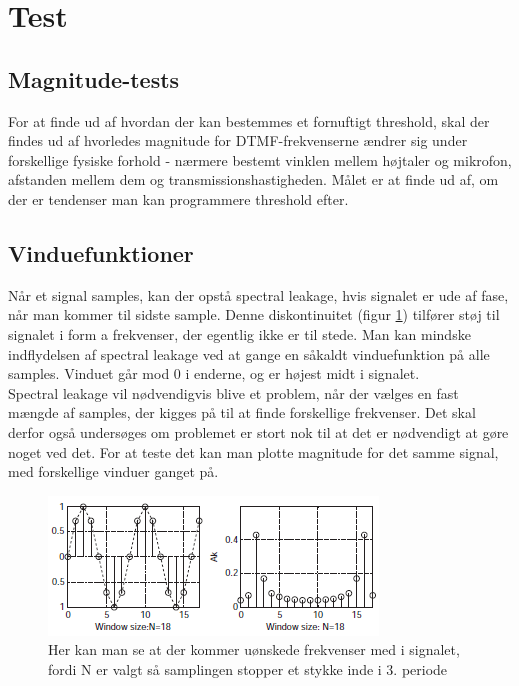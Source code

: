 \section{Test}

\subsection{Magnitude-tests}

For at finde ud af hvordan der kan bestemmes et fornuftigt threshold, skal der findes ud af hvorledes magnitude for DTMF-frekvenserne ændrer sig under forskellige fysiske forhold - nærmere bestemt vinklen mellem højtaler og mikrofon, afstanden mellem dem og transmissionshastigheden. Målet er at finde ud af, om der er tendenser man kan programmere threshold efter. 

\subsection{Vinduefunktioner}

Når et signal samples, kan der opstå spectral leakage, hvis signalet er ude af fase, når man kommer til sidste sample. Denne diskontinuitet (figur \ref{fig:Spectral}) tilfører støj til signalet i form a frekvenser, der egentlig ikke er til stede. Man kan mindske indflydelsen af spectral leakage ved at gange en såkaldt vinduefunktion på alle samples. Vinduet går mod 0 i enderne, og er højest midt i signalet.\\
Spectral leakage vil nødvendigvis blive et problem, når der vælges en fast mængde af samples, der kigges på til at finde forskellige frekvenser. Det skal derfor også undersøges om problemet er stort nok til at det er nødvendigt at gøre noget ved det. For at teste det kan man plotte magnitude for det samme signal, med forskellige vinduer ganget på. 

\begin{figure}[h]
\centering
\includegraphics[scale=0.8]{Billeder/SpectralLeak.PNG}
\caption{Her kan man se at der kommer uønskede frekvenser med i signalet, fordi N er valgt så samplingen stopper et stykke inde i 3. periode}
\label{fig:Spectral}
\end{figure} 


